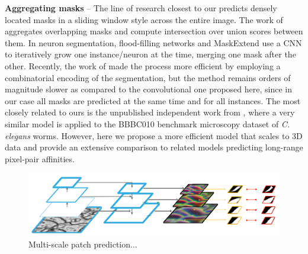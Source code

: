 \textbf{Aggregating \maskname masks} -- 
The line of research closest to our predicts densely located \maskname masks in a sliding window style across the entire image. The work of \cite{liu2016multi} aggregates overlapping masks and compute intersection over union scores between them.
In neuron segmentation, flood-filling networks \cite{januszewski2018high} and MaskExtend \cite{meirovitch2016multi} use a CNN to iteratively grow one instance/neuron at the time, merging one mask after the other. Recently, the work of \cite{meirovitch2019cross} made the process more efficient by employing a combinatorial encoding of the segmentation, but the method remains orders of magnitude slower as compared to the convolutional one proposed here, since in our case all masks are predicted at the same time and for all instances.
The most closely related to ours is the unpublished independent work from \cite{hirsch2020patchperpix}, where a very similar model is applied to the BBBC010 benchmark microscopy dataset of \emph{C. elegans} worms. However, here we propose a more efficient model that scales to 3D data and provide an extensive comparison to related models predicting long-range pixel-pair affinities. 

\begin{figure}[t]
\centering
        \includegraphics[width=\textwidth]{./figs/architecture.pdf} %
        \caption{Multi-scale patch prediction...}
    \label{fig:comparing_masks_affs}
\end{figure}


